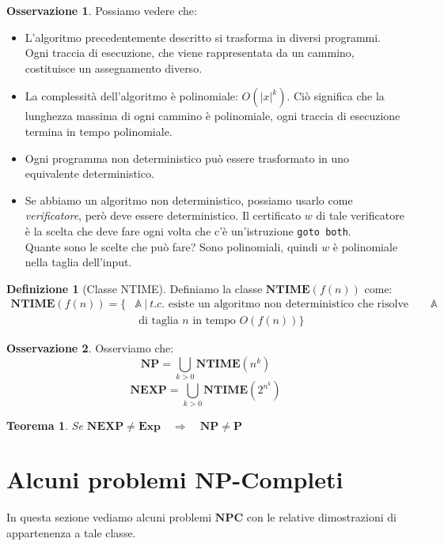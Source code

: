 \documentclass[a4paper]{article}
\newtheorem{thm}{Teorema}[subsection]
\theoremstyle{definition}
\newtheorem{definit}{Definizione}[subsection]
\newtheorem{obs}{Osservazione}[subsection]
\newcommand{\Exp}{\mathbf{Exp}}
\newcommand{\p}{\mathbf{P}}
\newcommand{\np}{\mathbf{NP}}
\newcommand{\npc}{\mathbf{NPC}}
\newcommand{\ntime}{\mathbf{NTIME}}
\newcommand{\nexp}{\mathbf{NEXP}}
\newcommand{\prob}[1]{\mathbb{#1}}
\begin{document}
	\begin{obs} Possiamo vedere che:
		\begin{itemize}
			\item L'algoritmo precedentemente descritto si trasforma in diversi programmi. Ogni traccia di esecuzione, che viene rappresentata da un cammino, costituisce un assegnamento diverso.		
			\item La complessità dell'algoritmo è polinomiale: $ O(\vert x \vert^k) $. Ciò significa che la lunghezza massima di ogni cammino è polinomiale, ogni traccia di esecuzione termina in tempo polinomiale.
			\item Ogni programma non deterministico può essere trasformato in uno equivalente deterministico.
			\item Se abbiamo un algoritmo non deterministico, possiamo usarlo come \textit{verificatore}, però deve essere deterministico. Il certificato $ w $ di tale verificatore è la scelta che deve fare ogni volta che c'è un'istruzione \lstinline|goto both|.\\
			Quante sono le scelte che può fare? Sono polinomiali, quindi $ w $ è polinomiale nella taglia dell'input.
		\end{itemize}
	\end{obs}
	
	\begin{definit}[Classe NTIME]
		Definiamo la classe $ \ntime(f(n)) $ come:
		\begin{align*}
			\ntime(f(n)) = \big\lbrace & \prob{A}\ \Big|\ t.c. \text{ esiste un algoritmo non deterministico che risolve istanze di } \prob{A}\\ 
			&\text{ di taglia } n \text{ in tempo } O(f(n)) \big\rbrace
		\end{align*}
	\end{definit}
	
	\begin{obs}
		Osserviamo che:
		\[
			\np = \bigcup_{k > 0} \ntime(n^k)
		\]
		\[
			\nexp = \bigcup_{k > 0} \ntime(2^{n^k})
		\]
	\end{obs}
	
	\begin{thm}
		Se $ \nexp  \neq \Exp \quad \Rightarrow\quad \np \neq \p $
	\end{thm}
	
	\section{Alcuni problemi NP-Completi}
		In questa sezione vediamo alcuni problemi $ \npc $ con le relative dimostrazioni di appartenenza a tale classe.
\end{document}
